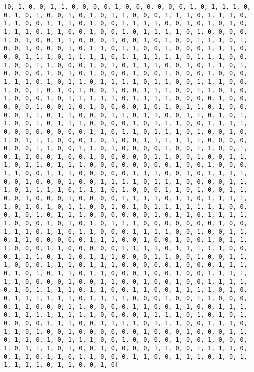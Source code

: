 \documentclass[11pt]{article}
\begin{document}
    \begin{Verbatim}[commandchars=\\\{\}]
[0, 1, 0, 0, 1, 1, 0, 0, 0, 0, 1, 0, 0, 0, 0, 0, 0, 1, 0, 1, 1, 1, 0, 0, 1, 0, 1, 0, 0, 1, 0, 1, 0, 1, 1, 0, 0, 0, 1, 1, 1, 0, 1, 1, 1, 0, 1, 1, 0, 0, 1, 1, 1, 0, 1, 0, 0, 1, 1, 1, 1, 0, 0, 1, 0, 1, 0, 1, 0, 1, 1, 1, 0, 1, 1, 0, 0, 1, 0, 0, 1, 0, 1, 1, 1, 1, 0, 1, 0, 0, 0, 0, 1, 0, 1, 0, 0, 1, 1, 0, 0, 0, 1, 0, 0, 1, 0, 1, 0, 0, 1, 1, 1, 0, 1, 0, 0, 1, 0, 0, 0, 1, 0, 1, 1, 0, 1, 1, 0, 0, 1, 0, 0, 0, 1, 1, 1, 0, 0, 0, 1, 1, 1, 0, 1, 1, 1, 1, 0, 1, 1, 1, 1, 1, 1, 0, 1, 1, 1, 0, 0, 1, 0, 0, 1, 1, 0, 0, 0, 1, 0, 1, 0, 1, 1, 1, 0, 0, 1, 0, 1, 1, 0, 1, 0, 0, 0, 0, 1, 0, 1, 0, 1, 0, 0, 0, 1, 0, 0, 1, 0, 0, 0, 1, 0, 0, 0, 1, 1, 1, 0, 1, 0, 1, 1, 0, 1, 1, 1, 1, 0, 1, 1, 0, 0, 1, 1, 1, 0, 0, 1, 0, 0, 1, 0, 1, 0, 1, 0, 0, 1, 0, 0, 1, 1, 1, 0, 0, 1, 1, 0, 1, 0, 1, 0, 0, 0, 1, 0, 1, 1, 1, 1, 1, 0, 1, 1, 1, 1, 0, 0, 0, 0, 1, 0, 0, 0, 0, 0, 1, 0, 0, 1, 0, 1, 0, 0, 0, 0, 1, 0, 1, 0, 1, 1, 0, 1, 0, 0, 0, 0, 1, 1, 0, 1, 1, 0, 0, 0, 1, 1, 0, 1, 1, 0, 0, 1, 1, 0, 1, 0, 1, 1, 0, 0, 1, 0, 1, 1, 1, 0, 0, 0, 0, 1, 0, 1, 1, 1, 0, 0, 1, 1, 1, 1, 0, 0, 0, 0, 0, 0, 0, 0, 1, 1, 0, 1, 1, 0, 1, 1, 1, 0, 1, 0, 0, 1, 0, 1, 0, 1, 1, 1, 0, 0, 0, 1, 0, 1, 0, 0, 1, 1, 1, 1, 1, 1, 0, 0, 0, 0, 0, 0, 0, 1, 1, 0, 0, 1, 1, 0, 1, 0, 0, 0, 0, 1, 0, 0, 1, 1, 0, 0, 1, 0, 1, 1, 0, 0, 1, 0, 0, 1, 0, 0, 0, 0, 0, 1, 1, 0, 0, 1, 0, 0, 1, 1, 1, 0, 1, 1, 0, 1, 1, 1, 0, 0, 0, 0, 0, 0, 0, 0, 1, 0, 0, 1, 0, 0, 0, 1, 1, 0, 0, 1, 1, 1, 0, 0, 0, 0, 0, 1, 1, 1, 0, 0, 1, 0, 1, 1, 1, 1, 0, 0, 1, 0, 0, 0, 1, 0, 0, 1, 1, 1, 1, 0, 1, 1, 1, 0, 0, 0, 0, 1, 1, 1, 0, 1, 1, 1, 1, 0, 1, 1, 1, 0, 1, 0, 0, 0, 1, 1, 0, 1, 0, 0, 1, 1, 0, 0, 1, 0, 0, 0, 1, 0, 0, 0, 0, 1, 1, 1, 1, 0, 1, 1, 0, 1, 1, 1, 1, 1, 0, 1, 0, 1, 0, 1, 1, 0, 0, 1, 0, 1, 0, 1, 1, 1, 1, 1, 1, 1, 0, 0, 0, 1, 0, 1, 0, 1, 1, 1, 0, 0, 0, 0, 0, 0, 1, 0, 1, 1, 0, 1, 1, 1, 1, 1, 0, 0, 0, 1, 0, 1, 0, 1, 0, 1, 1, 1, 0, 0, 0, 0, 0, 0, 0, 1, 0, 0, 1, 1, 1, 0, 1, 1, 0, 1, 1, 0, 0, 0, 1, 1, 1, 1, 0, 0, 1, 0, 0, 1, 1, 0, 1, 1, 0, 0, 0, 0, 0, 1, 1, 1, 0, 0, 1, 0, 0, 1, 0, 0, 1, 0, 1, 1, 1, 0, 0, 0, 1, 1, 0, 0, 0, 0, 0, 1, 1, 1, 1, 0, 1, 1, 1, 1, 1, 0, 0, 0, 1, 1, 1, 0, 1, 1, 0, 1, 1, 1, 0, 0, 0, 1, 1, 0, 0, 1, 0, 0, 1, 1, 1, 0, 0, 0, 1, 1, 1, 0, 1, 1, 1, 0, 0, 0, 0, 0, 1, 0, 0, 0, 1, 1, 1, 0, 1, 0, 1, 0, 1, 1, 0, 1, 1, 0, 0, 0, 1, 0, 0, 1, 0, 0, 1, 1, 1, 1, 1, 1, 0, 0, 0, 0, 1, 0, 0, 1, 1, 0, 0, 1, 0, 0, 1, 0, 0, 1, 1, 1, 1, 0, 1, 0, 1, 1, 1, 1, 0, 1, 1, 0, 0, 1, 1, 0, 0, 1, 1, 1, 1, 0, 1, 0, 0, 1, 1, 1, 1, 1, 1, 0, 1, 1, 1, 1, 0, 0, 0, 1, 0, 0, 1, 1, 0, 0, 0, 0, 1, 1, 0, 0, 0, 1, 1, 0, 0, 0, 0, 1, 1, 0, 0, 1, 1, 0, 0, 1, 1, 1, 0, 1, 1, 1, 1, 1, 1, 1, 1, 0, 0, 0, 0, 1, 1, 1, 1, 0, 1, 0, 1, 0, 1, 0, 0, 0, 0, 1, 1, 1, 0, 0, 1, 1, 1, 1, 0, 1, 1, 1, 0, 0, 1, 1, 1, 0, 1, 1, 0, 1, 0, 0, 1, 0, 0, 0, 0, 0, 0, 1, 0, 0, 0, 1, 0, 0, 0, 1, 1, 0, 1, 1, 0, 1, 0, 1, 1, 1, 0, 0, 1, 0, 0, 0, 0, 1, 0, 0, 1, 0, 0, 0, 1, 0, 1, 1, 1, 0, 1, 0, 0, 1, 0, 0, 0, 0, 1, 1, 0, 0, 1, 1, 1, 1, 0, 0, 1, 1, 0, 1, 1, 0, 1, 1, 0, 0, 0, 1, 1, 0, 0, 1, 1, 1, 0, 1, 0, 1, 1, 1, 1, 1, 0, 1, 1, 0, 0, 1, 0]

    \end{Verbatim}
\end{document}
